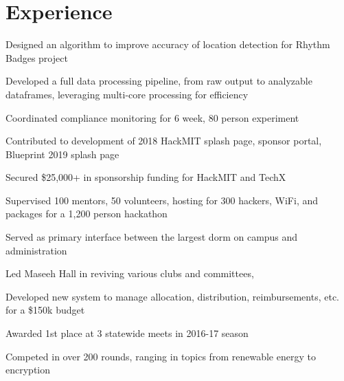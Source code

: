 \documentclass[]{deedy-resume-openfont}
\begin{document}
\section{Experience}
\hfill {}
\begin{tightemize}
	\item Designed an algorithm to improve accuracy of location detection for Rhythm Badges project
	\item Developed a full data processing pipeline, from raw output to analyzable dataframes, leveraging multi-core processing for efficiency
	\item Coordinated compliance monitoring for 6 week, 80 person experiment
\end{tightemize}
\sectionsep
{}\hfill {}
\begin{tightemize}
	\item Contributed to development of 2018 HackMIT splash page, sponsor portal, Blueprint 2019 splash page
	\item Secured \$25,000+ in sponsorship funding for HackMIT and TechX
	\item Supervised 100 mentors, 50 volunteers, hosting for 300 hackers, WiFi, and packages for a 1,200 person hackathon
\end{tightemize}
\sectionsep
{}\hfill {}
\begin{tightemize}
    \item Served as primary interface between the largest dorm on campus and administration
    \item Led Maseeh Hall in reviving various clubs and committees, 
	\item Developed new system to manage allocation, distribution, reimbursements, etc. for a \$150k budget
\end{tightemize}
\sectionsep
{}\hfill {}
\begin{tightemize}
	\item Awarded 1st place at 3 statewide meets in 2016-17 season
	\item Competed in over 200 rounds, ranging in topics from renewable energy to encryption
\end{tightemize}
\sectionsep
\end{document}
